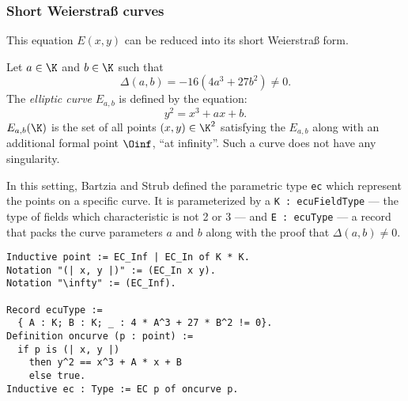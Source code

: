 \subsubsection{Short Weierstra{\ss} curves}
\label{subsec:ECC-Weierstrass}

This equation $E(x,y)$ can be reduced into its short Weierstra{\ss} form.

\begin{dfn}
Let $a \in \K$ and $b \in \K$ such that $$\Delta(a,b) = -16(4a^3 + 27b^2) \neq 0.$$
The \textit{elliptic curve} $E_{a,b}$ is defined by the equation:
$$y^2 = x^3 + ax + b.$$
$E_{a,b}(\K)$ is the set of all points $(x,y) \in \K^2$ satisfying the $E_{a,b}$
along with an additional formal point $\Oinf$, ``at infinity''. Such a curve does not have any singularity.
\end{dfn}

In this setting, Bartzia and Strub defined the parametric type \texttt{ec} which
represent the points on a specific curve. It is parameterized by
a \texttt{K : ecuFieldType} --- the type of fields which characteristic is not 2 or 3 ---
and \texttt{E : ecuType} --- a record that packs the curve parameters $a$ and $b$
along with the proof that $\Delta(a,b) \neq 0$.
\begin{lstlisting}[language=Coq]
Inductive point := EC_Inf | EC_In of K * K.
Notation "(| x, y |)" := (EC_In x y).
Notation "\infty" := (EC_Inf).

Record ecuType :=
  { A : K; B : K; _ : 4 * A^3 + 27 * B^2 != 0}.
Definition oncurve (p : point) :=
  if p is (| x, y |)
    then y^2 == x^3 + A * x + B
    else true.
Inductive ec : Type := EC p of oncurve p.
\end{lstlisting}

